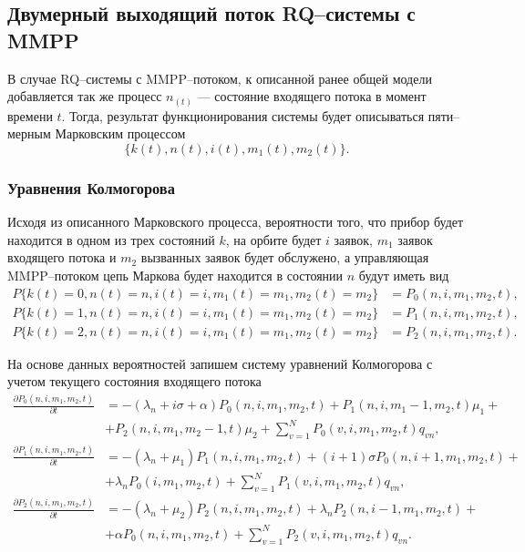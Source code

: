 \subsection{Двумерный выходящий поток RQ--системы с MMPP} \label{section_map_twodim}
В случае RQ--системы с MMPP--потоком, к описанной ранее общей модели добавляется так же процесс $n_(t)$ --- состояние входящего потока в момент времени $t$. Тогда, результат функционирования системы будет описываться пяти--мерным Марковским процессом
\begin{equation*}
	\{k(t),n(t),i(t),m_{1}(t),m_{2}(t)\}.
\end{equation*}

\subsubsection{Уравнения Колмогорова}
Исходя из описанного Марковского процесса, вероятности того, что прибор будет находится в одном из трех состояний $k$, на орбите будет $i$ заявок, $m_{1}$ заявок входящего потока и $m_{2}$ вызванных заявок будет обслужено, а управляющая MMPP--потоком цепь Маркова будет находится в состоянии $n$ будут иметь вид
\begin{equation*}
	\begin{split}
		P\{k(t)=0,n(t)=n,i(t)=i,m_{1}(t)=m_{1},m_{2}(t)=m_{2}\} &=P_{0}(n,i,m_{1},m_{2},t),\\
		P\{k(t)=1,n(t)=n,i(t)=i,m_{1}(t)=m_{1},m_{2}(t)=m_{2}\} &=P_{1}(n,i,m_{1},m_{2},t),\\
		P\{k(t)=2,n(t)=n,i(t)=i,m_{1}(t)=m_{1},m_{2}(t)=m_{2}\} &=P_{2}(n,i,m_{1},m_{2},t).
	\end{split}
\end{equation*} 

На основе данных вероятностей запишем систему уравнений Колмогорова с учетом текущего состояния входящего потока
\begin{equation} \label{kolmogorov_equations_twodim_map}
	\begin{split}
		\frac{{\partial P_{0}(n,i,m_{1},m_{2},t)}}{{\partial t}} &= -(\lambda_{n} + i\sigma + \alpha)P_{0}(n,i,m_{1},m_{2},t) + P_{1}(n,i,m_{1}-1,m_{2},t)\mu_{1} +\\  &+ P_{2}(n,i,m_{1},m_{2}-1,t)\mu_{2} + \sum_{v=1}^{N} P_{0}(v,i,m_{1},m_{2},t)q_{vn},
		\\
		\frac{{\partial P_{1}(n,i,m_{1},m_{2},t)}}{{\partial t}} &= -(\lambda_{n} + \mu_{1})P_{1}(n,i,m_{1},m_{2},t) + (i+1)\sigma P_{0}(n,i+1,m_{1},m_{2},t) +\\ &+ \lambda_{n}  P_{0}(i,m_{1},m_{2},t) + \sum_{v=1}^{N}P_{1}(v,i,m_{1},m_{2},t)q_{vn},
		\\
		\frac{{\partial P_{2}(n,i,m_{1},m_{2},t)}}{{\partial t}} &= -(\lambda_{n} + \mu_{2})P_{2}(n,i,m_{1},m_{2},t) + \lambda_{n} P_{2}(n,i-1,m_{1},m_{2},t)  +\\ &+ \alpha  P_{0}(n,i,m_{1},m_{2},t) +  \sum_{v=1}^{N}P_{2}(v,i,m_{1},m_{2},t)q_{vn}.
	\end{split}
\end{equation}	


